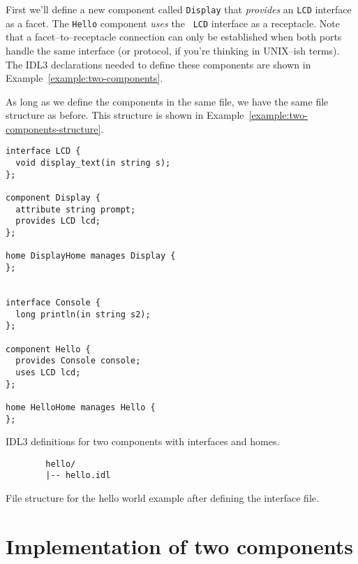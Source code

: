 First we'll define a new component called {\tt Display} that {\it provides} an
{\tt LCD} interface as a facet. The {\tt Hello} component {\it uses} the {\tt
LCD} interface as a receptacle. Note that a facet--to--receptacle connection can
only be established when both ports handle the same interface (or protocol, if
you're thinking in UNIX--ish terms). The IDL3 declarations needed to define
these components are shown in Example~\ref{example:two-components}.

As long as we define the components in the same file, we have the same file
structure as before. This structure is shown in
Example~\ref{example:two-components-structure}.

\begin{Example}
\begin{minifbox}
\begin{small}
\begin{verbatim}
interface LCD {
  void display_text(in string s);
};

component Display {
  attribute string prompt;
  provides LCD lcd;
};

home DisplayHome manages Display {
};


interface Console {
  long println(in string s2);
};

component Hello {
  provides Console console;
  uses LCD lcd;
};

home HelloHome manages Hello {
};
\end{verbatim}
\end{small}
\end{minifbox}
\caption{IDL3 definitions for two components with interfaces and homes.}
\label{example:two-components}
\end{Example}

\begin{Example}
\begin{minifbox}
\begin{small}
\begin{verbatim}
        hello/
        |-- hello.idl
\end{verbatim}
\end{small}
\end{minifbox}
\caption{File structure for the hello world example after defining the interface
file.}
\label{example:two-components-structure}
\end{Example}

\section{Implementation of two components}

